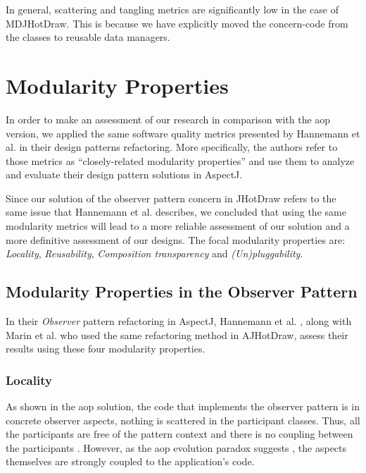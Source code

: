 In general, scattering and tangling metrics are significantly low in the case of MDJHotDraw.
This is because we have explicitly moved the concern-code from the classes to reusable data managers.

\section{Modularity Properties}\label{Eval Modularity Properties}

In order to make an assessment of our research in comparison with the \ac{aop} version, we applied the same software quality metrics presented by Hannemann et al. \cite{hannemann2002design} in their design patterns refactoring.
More specifically, the authors refer to those metrics as ``closely-related modularity properties'' and use them to analyze and evaluate their design pattern solutions in AspectJ.

Since our solution of the observer pattern concern in JHotDraw refers to the same issue that Hannemann et al. \cite{hannemann2005role} describes, we concluded that using the same modularity metrics will lead to a more reliable assessment of our solution and a more definitive assessment of our designs.
The focal modularity properties are: \textit{Locality}, \textit{Reusability}, \textit{Composition transparency} and \textit{(Un)pluggability}. 

\subsection{Modularity Properties in the Observer Pattern}

In their \textit{Observer} pattern refactoring in AspectJ, Hannemann et al. \cite{hannemann2005role}, along with Marin et al. \cite{marin2005approach} who used the same refactoring method in AJHotDraw, assess their results using these four modularity properties.

\subsubsection{Locality}
As shown in the \ac{aop} solution, the code that implements the observer pattern is in concrete observer aspects, nothing is scattered in the participant classes. 
Thus, all the participants are free of the pattern context and there is no coupling between the participants \cite{hannemann2005role}.
However, as the \ac{aop} evolution paradox suggests \cite{tourwe2003existence}, the aspects themselves are strongly coupled to the application's code.


